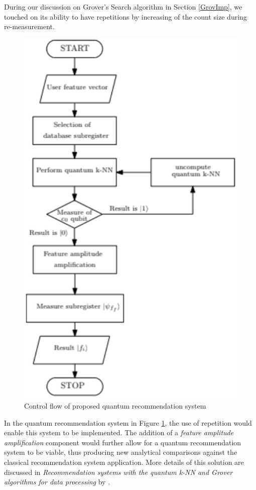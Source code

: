 During our discussion on Grover's Search algorithm in Section \ref{GrovImp}, we touched on its ability to have repetitions by increasing of the count size during re-measurement. 


\begin{figure}[h!]
      \centering
      \includegraphics[scale=0.5]{background/RCC.png}
      \caption{Control flow of proposed quantum recommendation system
      \citep{MarkSwee}}
      \label{QRec}
\end{figure}

In the quantum recommendation system in Figure \ref{QRec}, the use of repetition would enable this system to be  implemented. The addition of a \emph{feature amplitude amplification} component would further allow for a quantum recommendation system to be viable, thus producing new analytical comparisons against the classical recommendation system application. More details of this solution are discussed in \emph{Recommendation systems with the quantum k-NN and Grover algorithms for data processing} by %
 \citeauthor{MarkSwee}.


